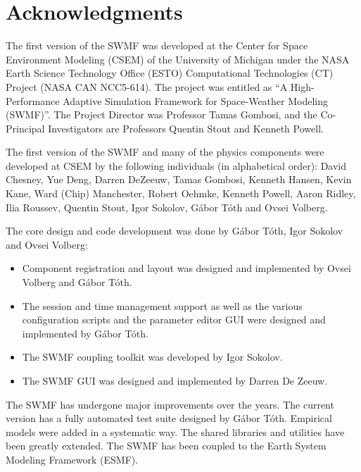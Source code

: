 \section{Acknowledgments}

The first version of the SWMF was developed at the Center for 
Space Environment Modeling (CSEM) of the University of Michigan under 
the NASA Earth Science Technology Office (ESTO) 
Computational Technologies (CT) Project (NASA
CAN NCC5-614). The project was entitled as ``A High-Performance
Adaptive Simulation Framework for Space-Weather Modeling (SWMF)''.
The Project Director was Professor Tamas Gombosi, and the Co-Principal
Investigators are Professors Quentin Stout and Kenneth Powell.

The first version of the SWMF and many of the physics components 
were developed at CSEM by the following individuals (in alphabetical order):
David Chesney, Yue Deng,
Darren DeZeeuw, Tamas Gombosi, Kenneth Hansen, Kevin Kane, Ward (Chip)
Manchester, Robert Oehmke, Kenneth Powell, Aaron Ridley, Ilia Roussev,
Quentin Stout, Igor Sokolov, G\'abor T\'oth and Ovsei Volberg.

The core design and code development was done by G\'abor
T\'oth, Igor Sokolov and Ovsei Volberg:
\begin{itemize}
\item Component registration and layout was designed and implemented by 
      Ovsei Volberg and G\'abor T\'oth.
\item The session and time management support as well as the various
      configuration scripts and the parameter editor GUI were designed and
      implemented by G\'abor T\'oth.
\item The SWMF coupling toolkit was developed by Igor Sokolov.
\item The SWMF GUI was designed and implemented by Darren De Zeeuw.
\end{itemize}
The SWMF has undergone major improvements over the years. 
The current version has a fully automated test suite designed
by G\'abor T\'oth. 
Empirical models were added in a systematic way.
The shared libraries and utilities have been greatly extended.
The SWMF has been coupled to the Earth System Modeling Framework (ESMF).

